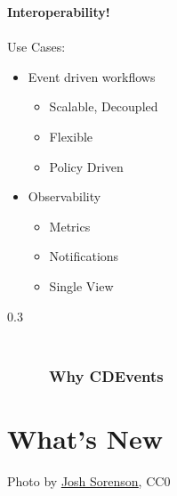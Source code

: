 \documentclass[aspectratio=169,11pt,hyperref={colorlinks=true}]{beamer}
\begin{document}
\begin{lpicrblack}[whycdevents]{}%
  {%
  \textbf{Interoperability!} \\
  ~ \\
  Use Cases:
  \begin{itemize}
    \item Event driven workflows
    \begin{itemize}
      \item Scalable, Decoupled
      \item Flexible
      \item Policy Driven
    \end{itemize}
    \item Observability
    \begin{itemize}
      \item Metrics
      \item Notifications
      \item Single View
    \end{itemize}
  \end{itemize}
  }%
  {0.3}
  \frametitle{~~~~~~~~~~~~~~~~~~~~~~~~~~~~~~~~~~~~~~~~~~~~~~~~~~~~~~~~~~Why CDEvents}
\end{lpicrblack}


\section{What's New}
\begin{sectionwithpiclargecentral}{Photo by \href{https://unsplash.com/@joshsorenson}{\underline{Josh Sorenson}}, CC0}
\end{sectionwithpiclargecentral}
\end{document}

